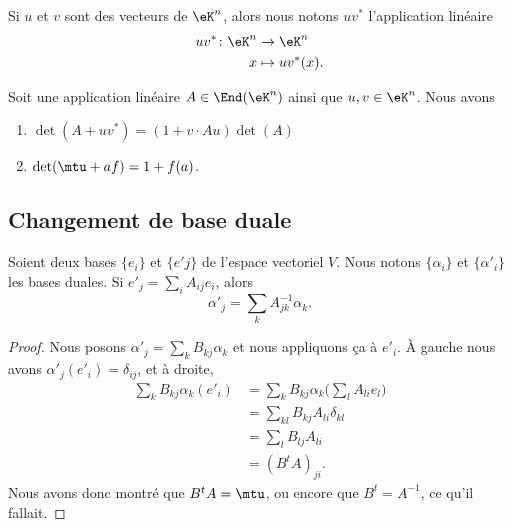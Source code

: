 Si \( u\) et \( v\) sont des vecteurs de \( \eK^n\), alors nous notons \( uv^*\) l'application linéaire
\begin{equation}
	\begin{aligned}
		uv^*\colon \eK^n & \to \eK^n        \\
		x                & \mapsto uv^*(x).
	\end{aligned}
\end{equation}

\begin{lemma}	\label{LEMooJVDHooONXNAh}
	Soit une application linéaire \( A\in\End(\eK^n)\) ainsi que \( u,v\in \eK^n\). Nous avons
	\begin{enumerate}
		\item
		      \( \det(A+uv^*)=(1+v\cdot Au)\det(A)\)
		\item		\label{ITEMooGJOZooVLfZcX}
		      \( \det(\mtu+af)=1+f(a)\).
	\end{enumerate}
\end{lemma}


\subsection{Changement de base duale}

\begin{proposition}		\label{PROPooDOEYooDpUbnc}
	Soient deux bases \( \{ e_i \}\) et \( \{ e'j \}\) de l'espace vectoriel \( V\). Nous notons \( \{ \alpha_i \}\) et \( \{ \alpha'_i \}\) les bases duales. Si \( e'_j=\sum_iA_{ij}e_i\), alors
	\begin{equation}
		\alpha'_j=\sum_kA_{jk}^{-1}\alpha_k.
	\end{equation}
\end{proposition}

\begin{proof}
	Nous posons \( \alpha'_j=\sum_kB_{kj}\alpha_k\) et nous appliquons ça à \( e'_i\). À gauche nous avons \( \alpha'_j(e'_i)=\delta_{ij}\), et à droite,
	\begin{subequations}
		\begin{align}
			\sum_kB_{kj}\alpha_k(e'_i) & = \sum_kB_{kj}\alpha_k\big( \sum_lA_{li}e_l \big) \\
			                           & = \sum_{kl}B_{kj}A_{li}\delta_{kl}                \\
			                           & = \sum_lB_{lj}A_{li}                              \\
			                           & = (B^tA)_{ji}.
		\end{align}
	\end{subequations}
	Nous avons donc montré que \( B^tA=\mtu\), ou encore que \( B^t=A^{-1}\), ce qu'il fallait.
\end{proof}

